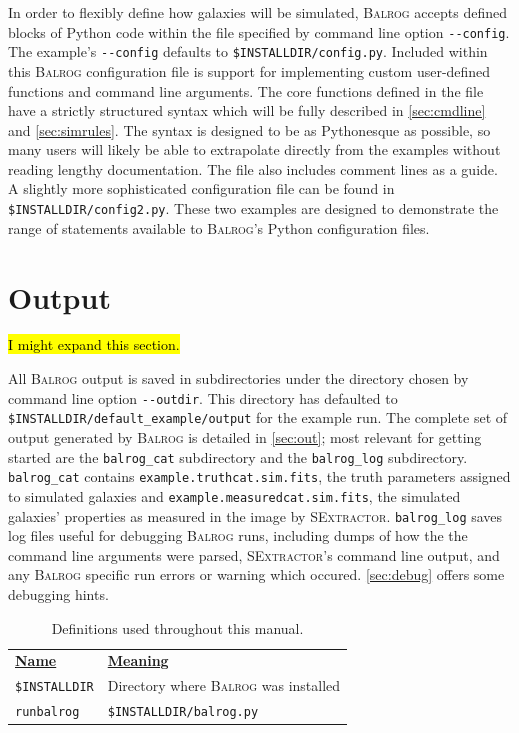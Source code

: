 \documentclass[12pt]{book}
\newcommand{\py}{Python}
\newcommand{\balrog}{\textsc{Balrog}}
\newcommand{\sex}{\textsc{SExtractor}}
\newcommand{\opt}[1]{{\texttt{-}\texttt{-#1}}}
\begin{document}
In order to flexibly define how galaxies will be simulated, \balrog{} accepts defined blocks of \py{} code
within the file specified by command line option \opt{config}.
The example's \opt{config} defaults to \texttt{\$INSTALLDIR/config.py}.
Included within this \balrog{} configuration file is support for implementing custom user-defined functions 
and command line arguments.
The core functions defined in the file have a strictly
structured syntax which will be fully described in \autoref{sec:cmdline} and \autoref{sec:simrules}. The syntax is designed to be as \py esque as possible, so
many users will likely be able to extrapolate directly from the examples without reading lengthy documentation. The file also
includes comment lines as a guide. A slightly more sophisticated configuration file can be found in \texttt{\$INSTALLDIR/config2.py}.
These two examples are designed to demonstrate the range of statements available to \balrog{}'s \py{} configuration files.


\section{Output}
\label{sec:output}

\hl{I might expand this section.}

All \balrog{} output is saved in subdirectories under the directory chosen by command line option \opt{outdir}.
This directory has defaulted to \texttt{\$INSTALLDIR/default\_example/output} for the example run.
The complete set of output generated by \balrog{} is detailed in \autoref{sec:out};
most relevant for getting started are the \texttt{balrog\_cat} subdirectory and the \texttt{balrog\_log} subdirectory.
\texttt{balrog\_cat} contains \texttt{example.truthcat.sim.fits}, the truth parameters assigned to simulated galaxies
and \texttt{example.measuredcat.sim.fits}, the simulated galaxies' properties as measured in the image by \sex{}.
\texttt{balrog\_log} saves log files useful for debugging \balrog{} runs, including dumps of how the the command line
arguments were parsed, \sex{}'s command line output, and any \balrog{} specific run errors or warning which occured.
\autoref{sec:debug} offers some debugging hints.


\begin{table}[h]
\caption{Definitions used throughout this manual.}
\label{tab:def}
\begin{tabular}{l l}
\underline{\textbf{Name}} & \underline{\textbf{Meaning}} \\
\texttt{\$INSTALLDIR} & Directory where \balrog{} was installed \\
\texttt{runbalrog} & \texttt{\$INSTALLDIR/balrog.py} \\
\end{tabular}
\end{table}
\end{document}
